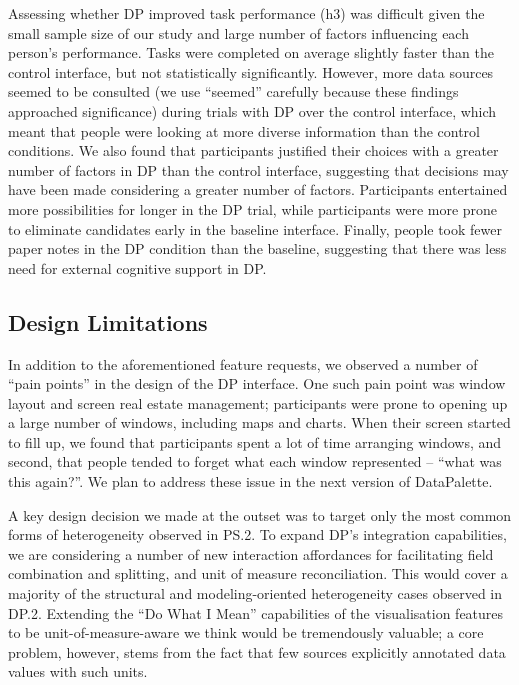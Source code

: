 \documentclass{sigchi}
\begin{document}
Assessing whether DP improved task performance (h3) was difficult given the small sample size of our study and large number of factors influencing each person's performance.  Tasks were completed on average slightly faster than the control interface, but not statistically significantly.  However, more data sources seemed to be consulted (we use ``seemed'' carefully because these findings approached significance) during trials with DP over the control interface, which meant that people were looking at more diverse information than the control conditions.  We also found that participants justified their choices with a greater number of factors in DP than the control interface, suggesting that decisions may have been made considering a greater number of factors.  Participants entertained more possibilities for longer in the DP trial, while participants were more prone to eliminate candidates early in the baseline interface.  Finally, people took fewer paper notes in the DP condition than the baseline, suggesting that there was less need for external cognitive support in DP.

\subsection{Design Limitations}

In addition to the aforementioned feature requests, we observed a number of ``pain points'' in the design of the DP interface.  One such pain point was window layout and screen real estate management; participants were prone to opening up a large number of windows, including maps and charts.  When their screen started to fill up, we found that participants spent a lot of time arranging windows, and second, that people tended to forget what each window represented -- ``what was this again?''.  We plan to address these issue in the next version of DataPalette.

A key design decision we made at the outset was to target only the most common forms of heterogeneity observed in PS.2.  To expand DP's integration capabilities, we are considering a number of new interaction affordances for facilitating field combination and splitting, and unit of measure reconciliation.  This would cover a majority of the structural and modeling-oriented heterogeneity cases observed in DP.2.  Extending the ``Do What I Mean'' capabilities of the visualisation features to be unit-of-measure-aware we think would be tremendously valuable; a core problem, however, stems from the fact that few sources explicitly annotated data values with such units.
\end{document}
